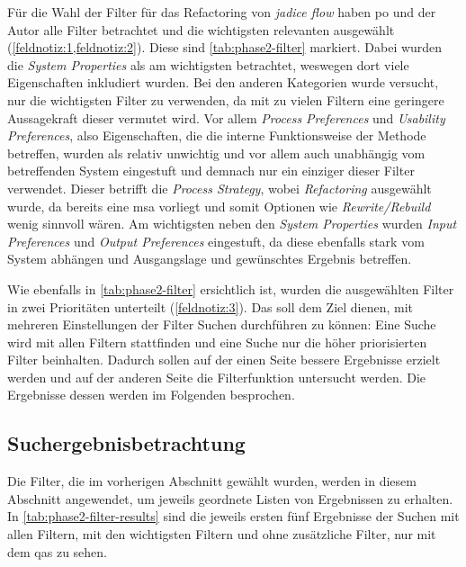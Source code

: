 Für die Wahl der Filter für das Refactoring von \emph{jadice flow} haben \gls{po} und der Autor alle Filter betrachtet und die wichtigsten relevanten ausgewählt (\cref{feldnotiz:1,feldnotiz:2}).
Diese sind \cref{tab:phase2-filter} markiert.
Dabei wurden die \emph{System Properties} als am wichtigsten betrachtet, weswegen dort viele Eigenschaften inkludiert wurden.
Bei den anderen Kategorien wurde versucht, nur die wichtigsten Filter zu verwenden, da mit zu vielen Filtern eine geringere Aussagekraft dieser vermutet wird.
Vor allem \emph{Process Preferences} und \emph{Usability Preferences}, also Eigenschaften, die die interne Funktionsweise der Methode betreffen, wurden als relativ unwichtig und vor allem auch unabhängig vom betreffenden System eingestuft und demnach nur ein einziger dieser Filter verwendet.
Dieser betrifft die \emph{Process Strategy}, wobei \emph{Refactoring} ausgewählt wurde, da bereits eine \gls{msa} vorliegt und somit Optionen wie \emph{Rewrite/Rebuild} wenig sinnvoll wären.
Am wichtigsten neben den \emph{System Properties} wurden \emph{Input Preferences} und \emph{Output Preferences} eingestuft, da diese ebenfalls stark vom System abhängen und Ausgangslage und gewünschtes Ergebnis betreffen.

Wie ebenfalls in \cref{tab:phase2-filter} ersichtlich ist, wurden die ausgewählten Filter in zwei Prioritäten unterteilt (\cref{feldnotiz:3}).
Das soll dem Ziel dienen, mit mehreren Einstellungen der Filter Suchen durchführen zu können: 
Eine Suche wird mit allen Filtern stattfinden und eine Suche nur die höher priorisierten Filter beinhalten.
Dadurch sollen auf der einen Seite bessere Ergebnisse erzielt werden und auf der anderen Seite die Filterfunktion untersucht werden.
Die Ergebnisse dessen werden im Folgenden besprochen.

\subsection{Suchergebnisbetrachtung}
\label{sec:phase2-ergebnisdurchsicht}

Die Filter, die im vorherigen Abschnitt gewählt wurden, werden in diesem Abschnitt angewendet, um jeweils geordnete Listen von Ergebnissen zu erhalten.
In \cref{tab:phase2-filter-results} sind die jeweils ersten fünf Ergebnisse der Suchen mit allen Filtern, mit den wichtigsten Filtern und ohne zusätzliche Filter, nur mit dem \glspl{qa} zu sehen. 



